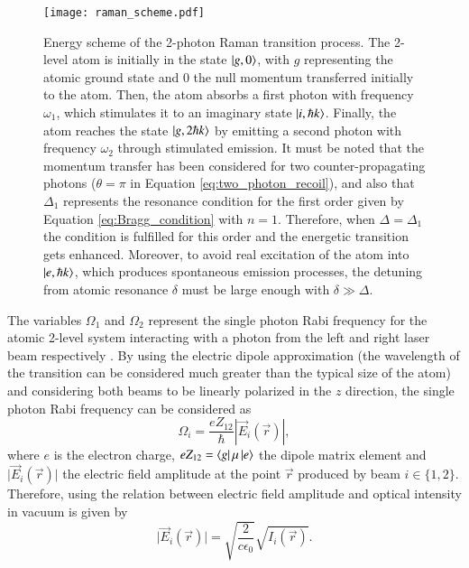 \begin{figure}[!htbp]\centering
	\texttt{[image: raman\_scheme.pdf]}
	\caption[Energy scheme of the 2-photon Raman transition process]{Energy scheme of the 2-photon Raman transition process. The 2-level atom is initially in the state $\ket{g, 0}$, with $g$ representing the atomic ground state and 0 the null momentum transferred initially to the atom. Then, the atom absorbs a first photon with frequency $\omega_1$, which stimulates it to an imaginary state $\ket{i, \hbar k}$. Finally, the atom reaches the state $\ket{g, 2\hbar k}$ by emitting a second photon with frequency $\omega_2$ through stimulated emission. It must be noted that the momentum transfer has been considered for two counter-propagating photons ($\theta=\pi$ in Equation \eqref{eq:two_photon_recoil}), and also that $\Delta_1$ represents the resonance condition for the first order given by Equation \eqref{eq:Bragg_condition} with $n=1$. Therefore, when $\Delta = \Delta_1$ the condition is fulfilled for this order and the energetic transition gets enhanced. Moreover, to avoid real excitation of the atom into $\ket{e, \hbar k}$, which produces spontaneous emission processes, the detuning from atomic resonance $\delta$ must be large enough with $\delta\gg\Delta$. }\label{fig:raman_scheme}
\end{figure}
The variables $\Omega_1$ and $\Omega_2$ represent the single photon Rabi frequency for the atomic 2-level system interacting with a photon from the left and right laser beam respectively \cite{Foot2005}. By using the electric dipole approximation (the wavelength of the transition can be considered much greater than the typical size of the atom) and considering both beams to be linearly polarized in the $z$ direction, the single photon Rabi frequency can be considered as
\begin{equation}
	\Omega_i = \frac{eZ_{12}}{\hbar} \mathopen|\vec{E}_{i}\mathclose(\vec{r})|,
\end{equation} 
where $e$ is the electron charge, $eZ_{12}=\bra{g}\mu\ket{e}$ the dipole matrix element and $\mathopen|\vec{E}_{i}(\vec{r})\mathclose|$ the electric field amplitude at the point $\vec{r}$ produced by beam $i\in \{1,2\}$. Therefore, using the relation between electric field amplitude and optical intensity in vacuum is given by
\begin{equation}
	\mathopen|\vec{E}_{i}(\vec{r})\mathclose| = \sqrt{\frac{2}{c \epsilon_0}}\sqrt{I_i(\vec{r})}.
\end{equation}

